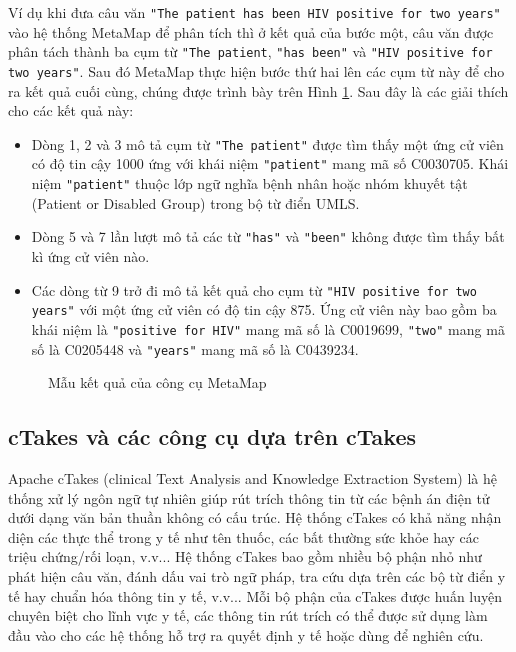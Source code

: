 Ví dụ khi đưa câu văn \texttt{"The patient has been HIV positive for two years"} vào hệ thống MetaMap để phân tích thì ở kết quả của bước một, câu văn được phân tách thành ba cụm từ \texttt{"The patient}, \texttt{"has been"} và \texttt{"HIV positive for two years"}. Sau đó MetaMap thực hiện bước thứ hai lên các cụm từ này để cho ra kết quả cuối cùng, chúng được trình bày trên Hình \ref{metamapoutput}. Sau đây là các giải thích cho các kết quả này:

\begin{itemize}
\item Dòng 1, 2 và 3 mô tả cụm từ \texttt{"The patient"} được tìm thấy một ứng cử viên có độ tin cậy 1000 ứng với khái niệm \texttt{"patient"} mang mã số C0030705. Khái niệm \texttt{"patient"} thuộc lớp ngữ nghĩa bệnh nhân hoặc nhóm khuyết tật (Patient or Disabled Group) trong bộ từ điển UMLS.
\item Dòng 5 và 7 lần lượt mô tả các từ \texttt{"has"} và \texttt{"been"} không được tìm thấy bất kì ứng cử viên nào.
\item Các dòng từ 9 trở đi mô tả kết quả cho cụm từ \texttt{"HIV positive for two years"} với một ứng cử viên có độ tin cậy 875. Ứng cử viên này bao gồm ba khái niệm là \texttt{"positive for HIV"} mang mã số là C0019699, \texttt{"two"} mang mã số là C0205448 và \texttt{"years"} mang mã số là C0439234. 
\end{itemize}

\begin{figure}[ht]
\centering

\caption{Mẫu kết quả của công cụ MetaMap\label{metamapoutput}}
\end{figure}

\subsection*{cTakes và các công cụ dựa trên cTakes}
Apache cTakes (clinical Text Analysis and Knowledge Extraction System) là hệ thống xử lý ngôn ngữ tự nhiên giúp rút trích thông tin từ các bệnh án điện tử dưới dạng văn bản thuần không có cấu trúc. Hệ thống cTakes có khả năng nhận diện các thực thể trong y tế như tên thuốc, các bất thường sức khỏe hay các triệu chứng/rối loạn, v.v... Hệ thống cTakes bao gồm nhiều bộ phận nhỏ như phát hiện câu văn, đánh dấu vai trò ngữ pháp, tra cứu dựa trên các bộ từ điển y tế hay chuẩn hóa thông tin y tế, v.v... Mỗi bộ phận của cTakes được huấn luyện chuyên biệt cho lĩnh vực y tế, các thông tin rút trích có thể được sử dụng làm đầu vào cho các hệ thống hỗ trợ ra quyết định y tế hoặc dùng để nghiên cứu.

